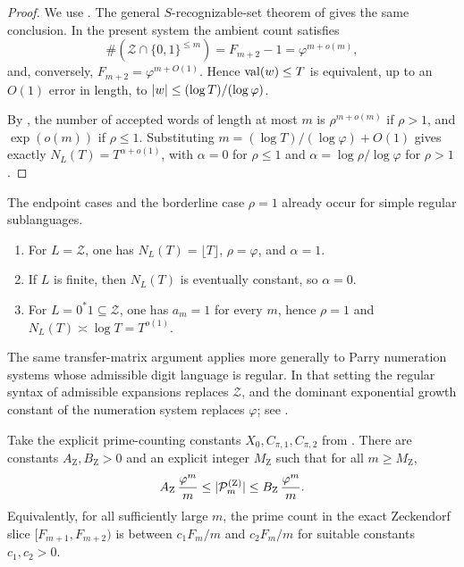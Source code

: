 \begin{proof}
  We use . The general
  \(S\)-recognizable-set theorem of
  \cite[Theorem~7]{CharlierRampersad2011} gives the same conclusion. In
  the present system the ambient count satisfies
  \[
    \#(\mathcal Z\cap\{0,1\}^{\le m})
    =F_{m+2}-1
    =\varphi^{m+o(m)},
  \]
  and, conversely, \(F_{m+2}=\varphi^{m+O(1)}\). Hence
  \(\operatorname{val}(w)\le T\) is equivalent, up to an \(O(1)\) error in length, to
  \(\lvert w \rvert\le (\log T)/(\log\varphi)\).

  By ,
  the number of accepted words of length at most \(m\) is
  \(\rho^{m+o(m)}\) if \(\rho>1\), and \(\exp(o(m))\) if \(\rho\le1\).
  Substituting \(m=(\log T)/(\log\varphi)+O(1)\) gives exactly
  \(N_L(T)=T^{\alpha+o(1)}\), with \(\alpha=0\) for \(\rho\le1\) and
  \(\alpha=\log\rho/\log\varphi\) for \(\rho>1\).
\end{proof}

\begin{remark}\label{rem:zeckendorf-examples}
  The endpoint cases and the borderline case \(\rho=1\) already occur
  for simple regular sublanguages.
  \begin{enumerate}[label=\textup{(\roman*)}]
    \item For \(L=\mathcal Z\), one has \(N_L(T)=\lfloor T\rfloor\),
    \(\rho=\varphi\), and \(\alpha=1\).
    \item If \(L\) is finite, then \(N_L(T)\) is eventually constant,
    so \(\alpha=0\).
    \item For \(L=0^\ast1\subseteq\mathcal Z\), one has \(a_m=1\) for
    every \(m\), hence \(\rho=1\) and
    \(N_L(T)\asymp \log T=T^{o(1)}\).
  \end{enumerate}
\end{remark}

\begin{remark}
  The same transfer-matrix argument applies more generally to Parry
  numeration systems whose admissible digit language is regular. In that
  setting the regular syntax of admissible expansions replaces
  \(\mathcal Z\), and the dominant exponential growth constant of the
  numeration system replaces \(\varphi\); see
  \cite{Frougny1992,BruyereHansel1997,LecomteRigo2001,Rigo2014Vol1,Rigo2014Vol2}.
\end{remark}

\begin{lemma}
  \label{lem:zeck-prime-count}
  Take the explicit prime-counting constants
  \(X_0,C_{\pi,1},C_{\pi,2}\) from . There are constants
  \(A_{\mathrm Z},B_{\mathrm Z}>0\) and an explicit integer \(M_{\mathrm Z}\)
  such that for all \(m\ge M_{\mathrm Z}\),
  \[
    A_{\mathrm Z}\,\frac{\varphi^m}{m}
    \le \lvert \mathcal P_m^{(\mathrm Z)} \rvert
    \le B_{\mathrm Z}\,\frac{\varphi^m}{m}.
  \]
  Equivalently, for all sufficiently large \(m\), the prime count in
  the exact Zeckendorf slice \([F_{m+1},F_{m+2})\) is between
  \(c_1F_m/m\) and \(c_2F_m/m\) for suitable constants
  \(c_1,c_2>0\).
\end{lemma}

